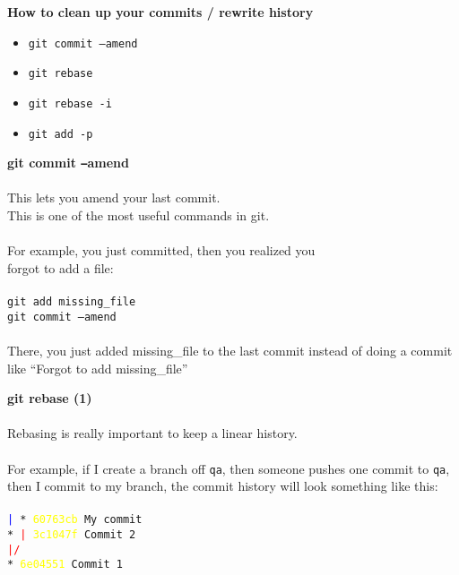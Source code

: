 \documentclass[landscape]{slides}
\begin{document}
\begin{slide}
\textbf{How to clean up your commits / rewrite history}\\
\begin{itemize}
\item{\tt{git commit --amend}}
\vspace{-10mm}
\item{\tt{git rebase}}
\vspace{-10mm}
\item{\tt{git rebase -i}}
\vspace{-10mm}
\item{\tt{git add -p}}
\end{itemize}
\end{slide}

\begin{slide}
\textbf{git commit {\tt--}amend}\\
\\
This lets you amend your last commit.\\
This is one of the most useful commands in git.\\
\\
For example, you just committed, then you realized you\\ forgot to add a file:\\
\\
{\tt git add missing\_file}\\
{\tt git commit --amend}\\
\\
There, you just added missing\_file to the last commit instead of doing a
commit like ``Forgot to add missing\_file''
\end{slide}

\begin{slide}
\textbf{git rebase (1)}\\
\\
Rebasing is really important to keep a linear history.\\
\\
For example, if I create a branch off {\tt qa}, then someone pushes one commit
to {\tt qa}, then I commit to my branch, the commit history will look something
like this:\\
\\
\tt{\textcolor{blue}{|} * \textcolor{yellow}{60763cb} My commit}\\
\tt{* \textcolor{red}{|} \textcolor{yellow}{3c1047f} Commit 2}\\
\textcolor{red}{\tt{|/}}\\
\tt{* \textcolor{yellow}{6e04551} Commit 1}\\
\end{slide}
\end{document}
